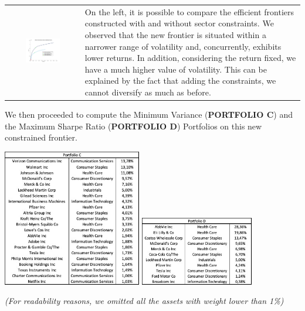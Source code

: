 \documentclass{assignment}
\begin{document}
\begin{tabular}{c m{}}
    \includegraphics[width=0.50\textwidth, valign=c]{assets/Plot_2.jpg}
    &
    On the left, it is possible to compare the efficient frontiers constructed with and without
    sector constraints. We observed that the new frontier is situated within a narrower range of
    volatility and, concurrently, exhibits lower returns. In addition, considering the return
    fixed, we have a much higher value of volatility. This can be explained by the fact that adding
    the constraints, we cannot diversify as much as before.
\end{tabular}
We then proceeded to compute the Minimum Variance (\textbf{PORTFOLIO C}) and the Maximum Sharpe
Ratio (\textbf{PORTFOLIO D}) Portfolios on this new constrained frontier.
\begin{center}
    \includegraphics[height=6cm]
    {assets/Port_C.jpg}
    \quad
    \includegraphics[height=3cm]
    {assets/Port_D.jpg}
\end{center}
\textit{(For readability reasons, we omitted all the assets with weight lower than 1\%)}\\\\
\end{document}
